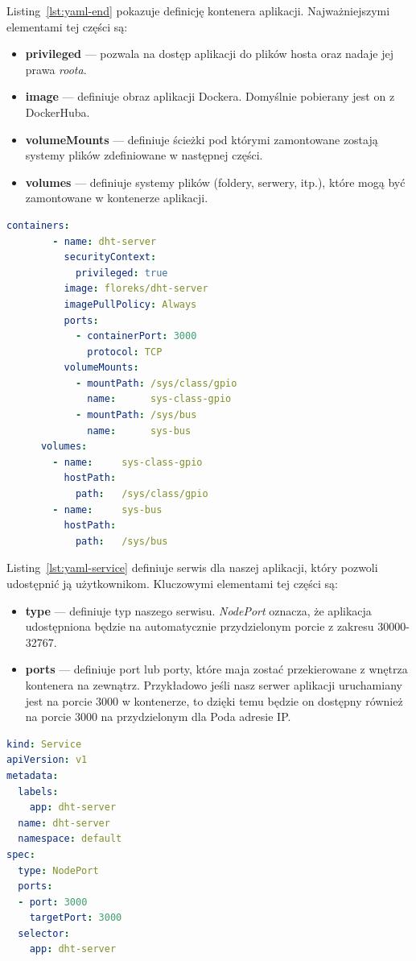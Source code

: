 \documentclass[12pt]{report}
\begin{document}
{\noindent Listing~\ref{lst:yaml-end} pokazuje definicję kontenera aplikacji. Najważniejszymi elementami tej części są:
\begin{itemize}
\item{\textbf{privileged} --- pozwala na dostęp aplikacji do plików hosta oraz nadaje jej prawa \textit{roota}.}
\item{\textbf{image} --- definiuje obraz aplikacji Dockera. Domyślnie pobierany jest on z DockerHuba.}
\item{\textbf{volumeMounts} --- definiuje ścieżki pod którymi zamontowane zostają systemy plików zdefiniowane w następnej części.}
\item{\textbf{volumes} --- definiuje systemy plików (foldery, serwery, itp.), które mogą być zamontowane w kontenerze aplikacji.}
\end{itemize}
\begin{lstlisting}[language=yaml,caption=Definicja aplikacji uruchamianej w klastrze - część 2,label=lst:yaml-end]             
      containers:
        - name: dht-server
          securityContext:
            privileged: true
          image: floreks/dht-server
          imagePullPolicy: Always
          ports:
            - containerPort: 3000
              protocol: TCP
          volumeMounts:
            - mountPath: /sys/class/gpio
              name:      sys-class-gpio
            - mountPath: /sys/bus
              name:      sys-bus
      volumes:
        - name:     sys-class-gpio
          hostPath:
            path:   /sys/class/gpio
        - name:     sys-bus
          hostPath:
            path:   /sys/bus
\end{lstlisting}

\newpage
\noindent Listing~\ref{lst:yaml-service} definiuje serwis dla naszej aplikacji, który pozwoli udostępnić ją użytkownikom. Kluczowymi elementami tej części są:
\begin{itemize}
\item{\textbf{type} --- definiuje typ naszego serwisu. \textit{NodePort} oznacza, że aplikacja udostępniona będzie na automatycznie przydzielonym porcie z zakresu 30000-32767. }
\item{\textbf{ports} --- definiuje port lub porty, które maja zostać przekierowane z wnętrza kontenera na zewnątrz. Przykładowo jeśli nasz serwer aplikacji uruchamiany jest na porcie 3000 w kontenerze, to dzięki temu będzie on dostępny również na porcie 3000 na przydzielonym dla Poda adresie IP.}
\end{itemize}
\begin{lstlisting}[language=yaml,caption=Definicja aplikacji uruchamianej w klastrze - część 3,label=lst:yaml-service]  
kind: Service
apiVersion: v1
metadata:
  labels:
    app: dht-server
  name: dht-server
  namespace: default
spec:
  type: NodePort
  ports:
  - port: 3000
    targetPort: 3000
  selector:
    app: dht-server
\end{lstlisting}

}
\end{document}
